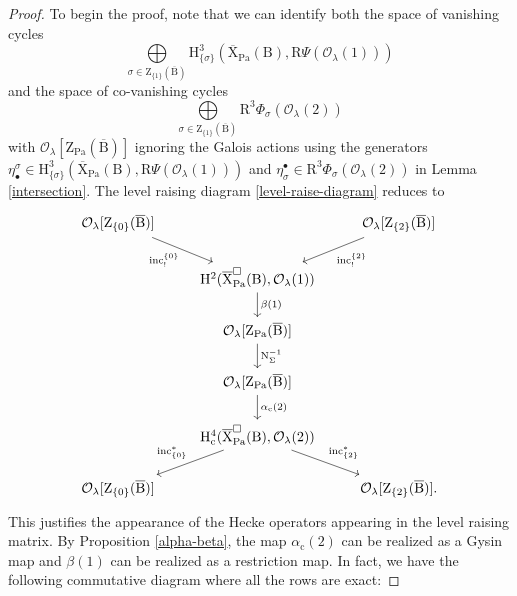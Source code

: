 \documentclass[10pt,a4paper]{amsart}
\def\Pa{\mathrm{Pa}}
\def\calO{\mathcal{O}}
\def\rmB{\mathrm{B}}
\def\rmH{\mathrm{H}}
\def\rmN{\mathrm{N}}
\def\rmR{\mathrm{R}}
\def\rmX{\mathrm{X}}
\def\rmZ{\mathrm{Z}}
\def\rmc{\mathrm{c}}
\begin{document}
\begin{proof}
To begin the proof, note that we can identify both the space of vanishing cycles
\begin{equation*}
\bigoplus\limits_{\sigma\in \rmZ_{\{1\}}(\overline{\rmB})}\rmH^{3}_{\{\sigma\}}(\overline{\rmX}_{\Pa}(\rmB), \rmR\Psi(\calO_{\lambda}(1))) 
\end{equation*}
and the space of co-vanishing cycles
\begin{equation*}
\bigoplus\limits_{\sigma\in \rmZ_{\{1\}}(\overline{\rmB})}\rmR^{3}\Phi_{\sigma}(\calO_{\lambda}(2)) 
\end{equation*}
with $\calO_{\lambda}[\rmZ_{\Pa}(\overline{\rmB})]$ ignoring the Galois actions using the generators $\eta^{\sigma}_{\bullet}\in\rmH^{3}_{\{\sigma\}}(\overline{\rmX}_{\Pa}(\rmB), \rmR\Psi(\calO_{\lambda}(1)))$ and $\eta^{\bullet}_{\sigma}\in \rmR^{3}\Phi_{\sigma}(\calO_{\lambda}(2))$ in Lemma \ref{intersection}. The level raising diagram \eqref{level-raise-diagram} reduces to 
\begin{equation}
\begin{tikzcd}
 \calO_{\lambda}[\rmZ_{\{0\}}(\overline{\rmB})] \arrow[rd, "\mathrm{inc}^{\{0\}}_{!}"'] &                                    &  \calO_{\lambda}[\rmZ_{\{2\}}(\overline{\rmB})]\arrow[ld, "\mathrm{inc}^{\{2\}}_{!}"] \\
                   & \rmH^{2}(\overline{\rmX}^{\square}_{\Pa}(\rmB), \calO_{\lambda}(1)) \arrow[d, "\beta(1)"]                   &                   \\
                   & \calO_{\lambda}[\rmZ_{\Pa}(\overline{\rmB})] \arrow[d, "\rmN^{-1}_{\Sigma}"]   &\\
                   & \calO_{\lambda}[\rmZ_{\Pa}(\overline{\rmB})] \arrow[d, "\alpha_{\rmc}(2)"]                   &                   \\
                   &  \rmH^{4}_{\rmc}(\overline{\rmX}^{\square}_{\Pa}(\rmB), \calO_{\lambda}(2)) \arrow[ld, "\mathrm{inc}^{\ast}_{\{0\}}"'] \arrow[rd, "\mathrm{inc}^{\ast}_{\{2\}}"] &                   \\
 \calO_{\lambda}[\rmZ_{\{0\}}(\overline{\rmB})]            &                                    &   \calO_{\lambda}[\rmZ_{\{2\}}(\overline{\rmB})].            
\end{tikzcd}
\end{equation}
This justifies the appearance of the Hecke operators appearing in the level raising matrix.
By Proposition \ref{alpha-beta}, the map $\alpha_{\rmc}(2)$ can be realized as a Gysin map and $\beta(1)$ can be realized as a restriction map. In fact, we have the following  commutative diagram where all the rows are exact:

\end{proof}
\end{document}
